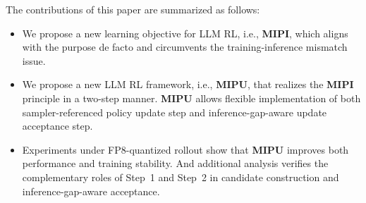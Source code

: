 The contributions of this paper are summarized as follows:
\begin{itemize}
    \item We propose a new learning objective for LLM RL, i.e., \textbf{MIPI}, which aligns with the purpose de facto and circumvents the training-inference mismatch issue.
    \item We propose a new LLM RL framework, i.e., \textbf{MIPU}, that realizes the \textbf{MIPI} principle in a two-step manner. \textbf{MIPU} allows flexible implementation of both sampler-referenced policy update step and inference-gap-aware update acceptance step.
    \item Experiments under FP8-quantized rollout show that \textbf{MIPU} improves both performance and training stability. And additional analysis verifies the complementary roles of Step~1 and Step~2 in candidate construction and inference-gap-aware acceptance.
\end{itemize}

